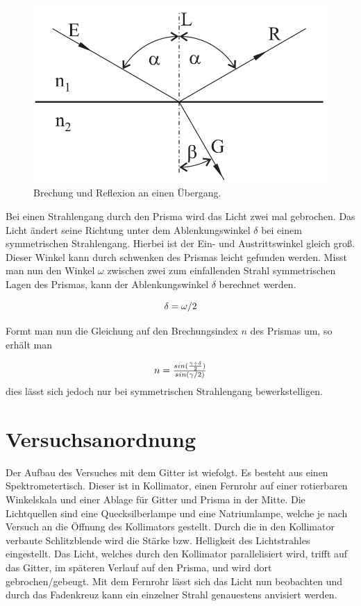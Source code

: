 \documentclass[12pt,a4paper,twoside]{article}
\begin{document}
\begin{figure}[H]
    \centering
    \includegraphics[width=0.6\linewidth]{nudes/Brechung.png}
    \caption{Brechung und Reflexion an einen Übergang. \cite{teachcenter2}}
    \label{fig:brechung}
\end{figure}

\noindent
Bei einen Strahlengang durch den Prisma wird das Licht zwei mal gebrochen. 
Das Licht ändert seine Richtung unter dem Ablenkungswinkel $\delta $ bei einem symmetrischen Strahlengang. Hierbei ist der Ein- und Austrittswinkel gleich groß. 
Dieser Winkel kann durch schwenken des Prismas leicht gefunden werden. 
Misst man nun den Winkel $\omega$ zwischen zwei zum einfallenden Strahl symmetrischen Lagen des Prismas, kann der Ablenkungswinkel $\delta $ berechnet werden. 

\begin{equation}
    \label{eq:Ablenkungswinkel}
    \centerline{$\delta = \omega /2$}
\end{equation}

\noindent
Formt man nun die Gleichung auf den Brechungsindex $n$ des Prismas um, so erhält man

\begin{equation}
    \label{eq:Brechungsindex}
    \centerline{$ n = \frac{sin(\frac{\gamma + \delta }{2})}{sin(\gamma /2)}$}
\end{equation}
dies lässt sich jedoch nur bei symmetrischen Strahlengang bewerkstelligen. 

\section{Versuchsanordnung} %
Der Aufbau des Versuches mit dem Gitter ist wiefolgt. Es besteht aus einen Spektrometertisch. Dieser ist in Kollimator, einen Fernrohr auf einer rotierbaren Winkelskala und einer Ablage für Gitter und Prisma in der Mitte. 
Die Lichtquellen sind eine Quecksilberlampe und eine Natriumlampe, welche je nach Versuch an die Öffnung des Kollimators gestellt. 
Durch die in den Kollimator verbaute Schlitzblende wird die Stärke bzw. Helligkeit des Lichtstrahles eingestellt. 
Das Licht, welches durch den Kollimator parallelisiert wird, trifft auf das Gitter, im späteren Verlauf auf den Prisma, und wird dort gebrochen/gebeugt. 
Mit dem Fernrohr lässt sich das Licht nun beobachten und durch das Fadenkreuz kann ein einzelner Strahl genauestens anvisiert werden. 
\end{document}
